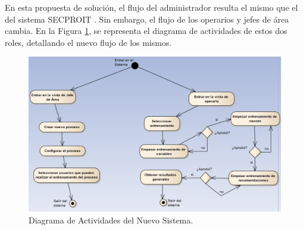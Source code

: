 En esta propuesta de solución, el flujo del administrador resulta el mismo que el del sistema SECPROIT \cite{elena}. Sin embargo, el flujo de los operarios y jefes de área cambia. En la Figura \ref{fig:actividades}, se representa el diagrama de actividades de estos dos roles, detallando el nuevo flujo de los mismos.

\begin{figure}[h]
\centering
 \includegraphics[width=0.5\linewidth]{imagen/actividades.png}
 \caption{Diagrama de Actividades del Nuevo Sistema.}
 \label{fig:actividades} 
\end{figure} 
